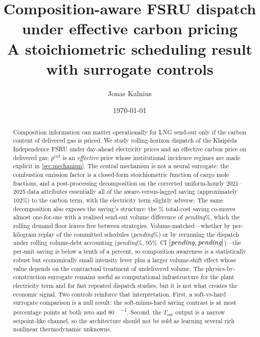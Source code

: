 \documentclass[11pt]{article}
\title{Composition-aware FSRU dispatch under effective carbon pricing\\
       A stoichiometric scheduling result with surrogate controls}
\author{Jonas Kalnius}
\date{\today}
\providecommand{\lngDecompCarbonSharePct}{102}                 %
\providecommand{\lngDecompDeliveredMassDeltaPct}{\emph{pending}}
\providecommand{\lngDecompSavingPerKgPct}{\emph{pending}}
\providecommand{\lngVolmatchSavingPct}{\emph{pending}}
\providecommand{\lngVolmatchCiNineFiveLoPct}{\emph{pending}}
\providecommand{\lngVolmatchCiNineFiveHiPct}{\emph{pending}}
\begin{document}
\maketitle

\begin{abstract}
Composition information can matter operationally for LNG send-out only if the
carbon content of delivered gas is priced. We study rolling-horizon dispatch of
the Klaip\.eda Independence FSRU under day-ahead electricity prices and an
effective carbon price on delivered gas; $p^{\text{co2}}$ is an
\emph{effective} price whose institutional incidence regimes are made explicit
in \cref{sec:mechanism}. The central mechanism is not a neural surrogate: the
combustion emission factor is a closed-form stoichiometric function of cargo
mole fractions, and a post-processing decomposition on the corrected
uniform-hourly 2021--2025 data attributes essentially all of the
aware-versus-lagged saving (approximately \lngDecompCarbonSharePct\%) to the
carbon term, with the electricity term slightly adverse. The same decomposition
also exposes the saving's structure: the \lngHeadlineSavingVsLaggedPct\%
total-cost saving co-moves almost one-for-one with a realised send-out volume
difference of \lngDecompDeliveredMassDeltaPct\%, which the rolling demand
floor leaves free between strategies. Volume-matched---whether by
per-kilogram replay of the committed schedules (\lngDecompSavingPerKgPct\%)
or by rerunning the dispatch under rolling volume-debt accounting
(\lngVolmatchSavingPct\%, $95\%$~CI $[\lngVolmatchCiNineFiveLoPct,
\lngVolmatchCiNineFiveHiPct]$)---the per-unit saving is below a tenth of a
percent, so composition awareness is a statistically robust but economically
small intensity lever plus a larger volume-shift effect whose value depends
on the contractual treatment of undelivered volume. The physics-by-construction
surrogate remains useful as computational infrastructure for the plant
electricity term and for fast repeated dispatch studies, but it is not what
creates the economic signal. Two controls reinforce that interpretation.
First, a soft-vs-hard surrogate comparison is a null result: the
soft-minus-hard saving contrast is at most \lngSvhMaxAbsContrastPp{}
percentage points at both zero and \SI{80}{\EUR\per\tCOtwo}. Second, the
$T_{\text{out}}$ output is a narrow setpoint-like channel, so the architecture
should not be sold as learning several rich nonlinear thermodynamic unknowns.
\end{abstract}
\end{document}
